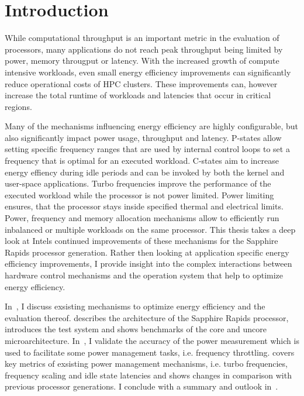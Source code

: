 \chapter{Introduction}
\label{sec:introduction}

While computational throughput is an important metric in the evaluation of processors, many applications do not reach peak throughput being limited by power, memory througput or latency.
With the increased growth of compute intensive workloads, even small energy efficiency improvements can significantly reduce operational costs of HPC clusters.
These improvements can, however increase the total runtime of workloads and latencies that occur in critical regions.

Many of the mechanisms influencing energy efficiency are highly configurable, but also significantly impact power usage, throughput and latency.
P-states allow setting specific frequency ranges that are used by internal control loops to set a frequency that is optimal for an executed workload.
C-states aim to increase energy effiency during idle periods and can be invoked by both the kernel and user-space applications.
Turbo frequencies improve the performance of the executed workload while the processor is not power limited.
Power limiting ensures, that the processor stays inside specified thermal and electrical limits.
Power, frequency and memory allocation mechanisms allow to efficiently run inbalanced or multiple workloads on the same processor.
This thesis takes a deep look at Intels continued improvements of these mechanisms for the Sapphire Rapids processor generation.
Rather then looking at application specific energy efficiency improvements, I provide insight into the complex interactions between hardware control mechanisms and the operation system that help to optimize energy efficiency.

In~, I discuss exsisting mechanisms to optimize energy efficiency and the evaluation thereof.
 describes the architecture of the Sapphire Rapids processor, introduces the test system and shows benchmarks of the core and uncore microarchitecture.
In~, I validate the accuracy of the power measurement which is used to facilitate some power management tasks, i.e. frequency throttling.
 covers key metrics of exsisting power management mechanisms, i.e. turbo frequencies, frequency scaling and idle state latencies and shows changes in comparison with previous processor generations.
I conclude with a summary and outlook in~.